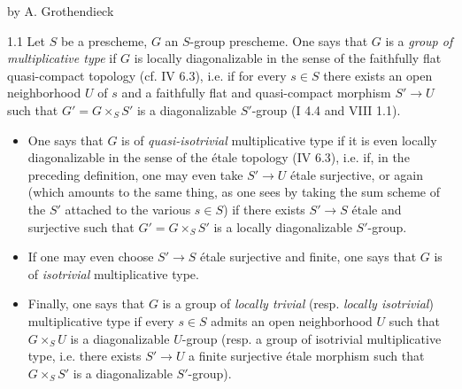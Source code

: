 \label{IX}
\begin{center}by A. Grothendieck\end{center}

\begin{definition}{1.1}\label{IX.1.1}
Let $S$ be a prescheme, $G$ an $S$-group prescheme. One says that $G$ is a \emph{group of multiplicative type} if $G$ is locally diagonalizable in the sense of the faithfully flat quasi-compact topology (cf. IV 6.3), i.e. if for every $s\in S$ there exists an open neighborhood $U$ of $s$ and a faithfully flat and quasi-compact morphism $S'\to U$ such that $G'=G\times_S S'$ is a diagonalizable $S'$-group (I 4.4 and VIII 1.1).
\begin{itemize}
\item One says that $G$ is of \emph{quasi-isotrivial} multiplicative type if it is even locally diagonalizable in the sense of the étale topology (IV 6.3), i.e. if, in the preceding definition, one may even take $S'\to U$ étale surjective, or again (which amounts to the same thing, as one sees by taking the sum scheme of the $S'$ attached to the various $s\in S$) if there exists $S'\to S$ étale and surjective such that $G'=G\times_S S'$ is a locally diagonalizable $S'$-group.
\item If one may even choose $S'\to S$ étale surjective and finite, one says that $G$ is of \emph{isotrivial} multiplicative type.
\item Finally, one says that $G$ is a group of \emph{locally trivial} (resp. \emph{locally isotrivial}) multiplicative type if every $s\in S$ admits an open neighborhood $U$ such that $G\times_S U$ is a diagonalizable $U$-group (resp. a group of isotrivial multiplicative type, i.e. there exists $S'\to U$ a finite surjective étale morphism such that $G\times_S S'$ is a diagonalizable $S'$-group).
\end{itemize}
\end{definition}

